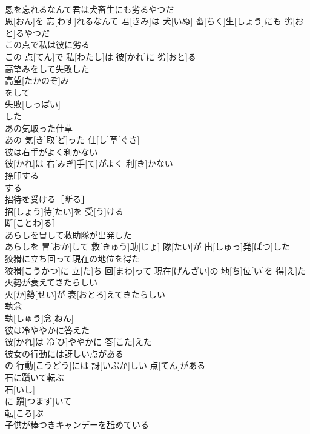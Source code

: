 \documentclass[8pt]{extreport}
\begin{document}
\begin{CJK}{UTF8}{min}
\\	恩を忘れるなんて君は犬畜生にも劣るやつだ	
\\	恩[おん]を 忘[わす]れるなんて 君[きみ]は 犬[いぬ] 畜[ちく]生[しょう]にも 劣[おと]るやつだ
\\	この点で私は彼に劣る	
\\	この 点[てん]で 私[わたし]は 彼[かれ]に 劣[おと]る
\\	高望みをして失敗した	
\\	高望[たかのぞ]み 
\\	をして 
\\	失敗[しっぱい]
\\	した 
\\	あの気取った仕草	
\\	あの 気[き]取[ど]った 仕[し]草[ぐさ]
\\	彼は右手がよく利かない	
\\	彼[かれ]は 右[みぎ]手[て]がよく 利[き]かない
\\	捺印する	
\\	[｟文語｠ 
\\	捺印[なついん]する
\\	招待を受ける［断る］	
\\	招[しょう]待[たい]を 受[う]ける
\\	断[ことわ]る］
\\	あらしを冒して救助隊が出発した	
\\	あらしを 冒[おか]して 救[きゅう]助[じょ] 隊[たい]が 出[しゅっ]発[ぱつ]した
\\	狡猾に立ち回って現在の地位を得た	
\\	狡猾[こうかつ]に 立[た]ち 回[まわ]って 現在[げんざい]の 地[ち]位[い]を 得[え]た
\\	火勢が衰えてきたらしい	
\\	火[か]勢[せい]が 衰[おとろ]えてきたらしい
\\	執念	
\\	執[しゅう]念[ねん]
\\	彼は冷ややかに答えた	
\\	彼[かれ]は 冷[ひ]ややかに 答[こた]えた
\\	彼女の行動には訝しい点がある	
\\	[｟口｠
\\	彼女[かのじょ]の 行動[こうどう]には 訝[いぶか]しい 点[てん]がある
\\	石に躓いて転ぶ	
\\	石[いし]
\\	に 躓[つまず]いて 
\\	転[ころ]ぶ 
\\	子供が棒つきキャンデーを舐めている	

\end{CJK}
\end{document}
